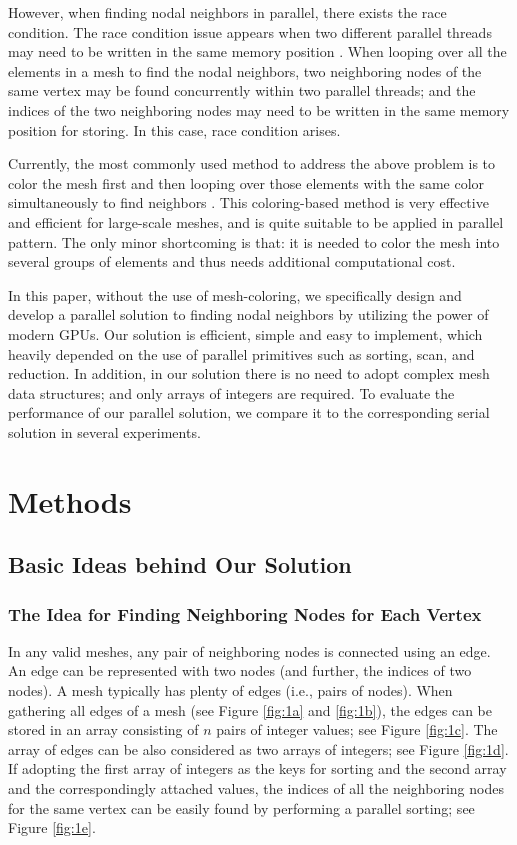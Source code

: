 \documentclass[twocolumn]{svjour3}          \smartqed  \usepackage{graphicx}
\begin{document}
However, when finding nodal neighbors in parallel, there exists the race 
condition. The race condition issue appears when two different parallel 
threads may need to be written in the same memory position \cite{06}. When looping over all the elements in a mesh to find 
the nodal neighbors, two neighboring nodes of the same vertex may be found 
concurrently within two parallel threads; and the indices of the two 
neighboring nodes may need to be written in the same memory position for 
storing. In this case, race condition arises. 

Currently, the most commonly used method to address the above problem is to 
color the mesh first and then looping over those elements with the same 
color simultaneously to find neighbors \cite{04_Chen2014,06,07,08_Benitez2014,09_Cheng2015}. This coloring-based 
method is very effective and efficient for large-scale meshes, and is quite 
suitable to be applied in parallel pattern. The only minor shortcoming is 
that: it is needed to color the mesh into several groups of elements and 
thus needs additional computational cost. 

In this paper, without the use of mesh-coloring, we specifically design and 
develop a parallel solution to finding nodal neighbors by utilizing the 
power of modern GPUs. Our solution is efficient, simple and easy to 
implement, which heavily depended on the use of parallel primitives such as 
sorting, scan, and reduction. In addition, in our solution there is no need 
to adopt complex mesh data structures; and only arrays of integers are 
required. To evaluate the performance of our parallel solution, we compare 
it to the corresponding serial solution in several experiments. 

\section{Methods}

\subsection{Basic Ideas behind Our Solution}

\subsubsection{The Idea for Finding Neighboring Nodes for Each Vertex}

In any valid meshes, any pair of neighboring nodes is connected using an 
edge. An edge can be represented with two nodes (and further, the indices of 
two nodes). A mesh typically has plenty of edges (i.e., pairs of nodes). 
When gathering all edges of a mesh (see Figure \ref{fig:1a} and \ref{fig:1b}), the edges can be stored in an array 
consisting of $n$ pairs of integer values; see Figure \ref{fig:1c}. The array of edges 
can be also considered as two arrays of integers; see Figure \ref{fig:1d}. If 
adopting the first array of integers as the keys for sorting and the second 
array and the correspondingly attached values, the indices of all the 
neighboring nodes for the same vertex can be easily found by performing a 
parallel sorting; see Figure \ref{fig:1e}.
\end{document}

